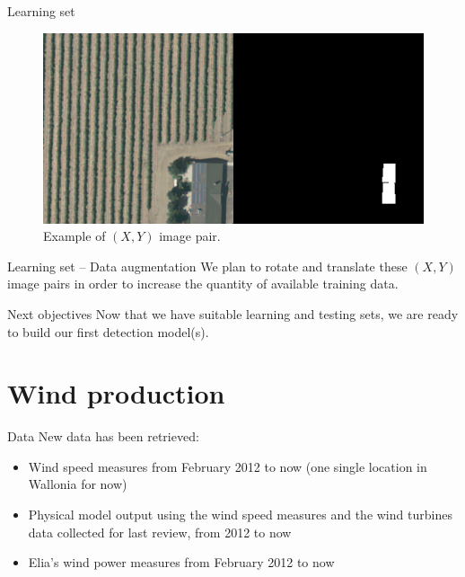 \documentclass[12pt]{beamer}
\begin{document}
\begin{frame}{Learning set}
    \begin{figure}
        \centering
        \includegraphics[width=\textwidth]{./resources/png/classification.png}
        \caption{Example of $(X, Y)$ image pair.}
    \end{figure}
\end{frame}

\begin{frame}{Learning set -- Data augmentation}
    We plan to \alert{rotate} and \alert{translate} these $(X, Y)$ image pairs in order to \alert{increase the quantity} of available training data.
\end{frame}

\begin{frame}{Next objectives}
    Now that we have suitable learning and testing sets, we are ready to build our \alert{first detection} model(s).
\end{frame}

\section{Wind production}

\begin{frame}{Data}
New data has been retrieved:
\begin{itemize}
    \item \alert{Wind speed measures} from February 2012 to now (one single location in Wallonia for now)
    \item \alert{Physical model output} using the wind speed measures and the wind turbines data collected for last review, from 2012 to now
    \item Elia's \alert{wind power measures} from February 2012 to now
\end{itemize}
\end{frame}
\end{document}

